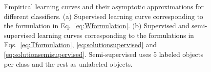 \documentclass[runningheads,a4paper]{llncs}\usepackage[]{graphicx}\usepackage[]{color}
\newenvironment{knitrout}{}{} %
\begin{document}
\begin{knitrout}
\color{fgcolor}\begin{figure}
\caption{Empirical learning curves and their asymptotic approximations for different classifiers. (a) Supervised learning curve corresponding to the formulation in Eq.~\eqref{eq:Wformulation}. (b) Supervised and semi-supervised learning curves corresponding to the formulations in Eqs.~\eqref{eq:Tformulation}, \eqref{eq:solutionsupervised} and \eqref{eq:solutionsemisupervised}. Semi-supervised uses $5$ labeled objects per class and the rest as unlabeled objects.}\label{fig:peaking-asymptotic}
\end{figure}


\end{knitrout}
\end{document}
